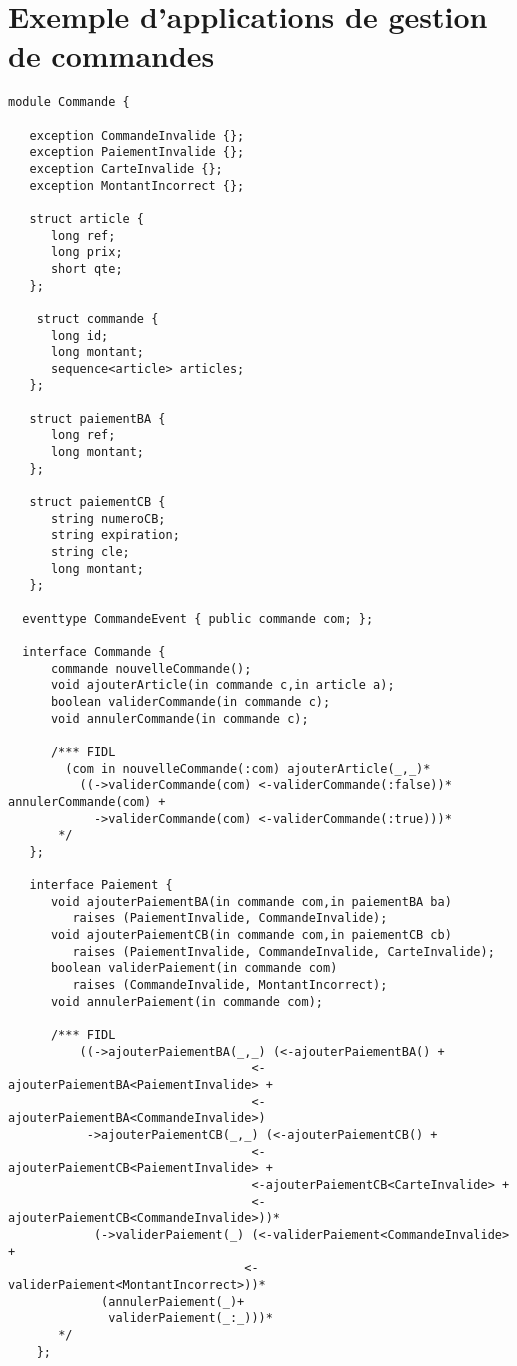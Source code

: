 \lstset{basicstyle=\footnotesize\sffamily,frame=none}

\section{Exemple d'applications de gestion de commandes}

\begin{lstlisting}
module Commande {

   exception CommandeInvalide {};
   exception PaiementInvalide {};
   exception CarteInvalide {};
   exception MontantIncorrect {};

   struct article {
      long ref; 
      long prix;
      short qte;
   };
 
    struct commande {
      long id;
      long montant;
      sequence<article> articles;
   };
   
   struct paiementBA {
      long ref;
      long montant;
   };

   struct paiementCB {
      string numeroCB;
      string expiration;
      string cle;
      long montant;
   };

  eventtype CommandeEvent { public commande com; };

  interface Commande {
      commande nouvelleCommande();
      void ajouterArticle(in commande c,in article a);
      boolean validerCommande(in commande c);
      void annulerCommande(in commande c);

      /*** FIDL
        (com in nouvelleCommande(:com) ajouterArticle(_,_)* 
          ((->validerCommande(com) <-validerCommande(:false))* annulerCommande(com) + 
            ->validerCommande(com) <-validerCommande(:true)))*
       */
   };

   interface Paiement {
      void ajouterPaiementBA(in commande com,in paiementBA ba) 
         raises (PaiementInvalide, CommandeInvalide);
      void ajouterPaiementCB(in commande com,in paiementCB cb) 
         raises (PaiementInvalide, CommandeInvalide, CarteInvalide);
      boolean validerPaiement(in commande com) 
         raises (CommandeInvalide, MontantIncorrect);
      void annulerPaiement(in commande com);

      /*** FIDL
          ((->ajouterPaiementBA(_,_) (<-ajouterPaiementBA() + 
                                  <-ajouterPaiementBA<PaiementInvalide> + 
                                  <-ajouterPaiementBA<CommandeInvalide>) 
           ->ajouterPaiementCB(_,_) (<-ajouterPaiementCB() + 
                                  <-ajouterPaiementCB<PaiementInvalide> + 
                                  <-ajouterPaiementCB<CarteInvalide> + 
                                  <-ajouterPaiementCB<CommandeInvalide>))*
            (->validerPaiement(_) (<-validerPaiement<CommandeInvalide> + 
                                 <-validerPaiement<MontantIncorrect>))*
             (annulerPaiement(_)+
              validerPaiement(_:_)))*                                 
       */
    };


\end{lstlisting}
